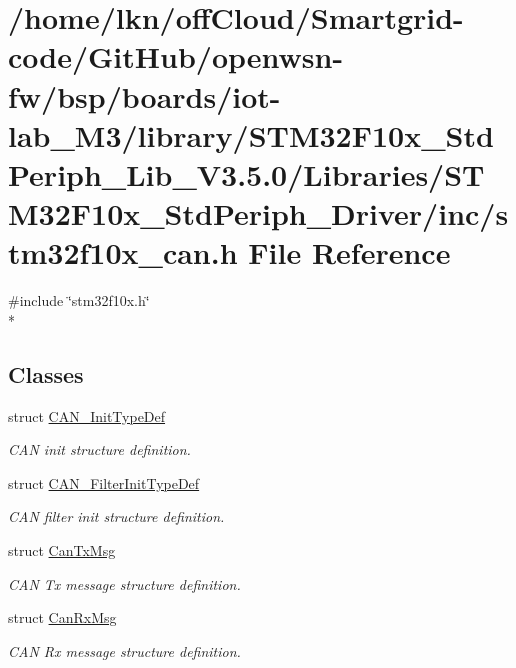 \hypertarget{iot-lab___m3_2library_2_s_t_m32_f10x___std_periph___lib___v3_85_80_2_libraries_2_s_t_m32_f10x___8ddc44d808dd489e74f711417ad7412c}{}\section{/home/lkn/off\+Cloud/\+Smartgrid-\/code/\+Git\+Hub/openwsn-\/fw/bsp/boards/iot-\/lab\+\_\+\+M3/library/\+S\+T\+M32\+F10x\+\_\+\+Std\+Periph\+\_\+\+Lib\+\_\+\+V3.5.0/\+Libraries/\+S\+T\+M32\+F10x\+\_\+\+Std\+Periph\+\_\+\+Driver/inc/stm32f10x\+\_\+can.h File Reference}
\label{iot-lab___m3_2library_2_s_t_m32_f10x___std_periph___lib___v3_85_80_2_libraries_2_s_t_m32_f10x___8ddc44d808dd489e74f711417ad7412c}
{\ttfamily \#include \char`\"{}stm32f10x.\+h\char`\"{}}\\*
\subsection*{Classes}
\begin{DoxyCompactItemize}
\item 
struct \hyperlink{struct_c_a_n___init_type_def}{C\+A\+N\+\_\+\+Init\+Type\+Def}
\begin{DoxyCompactList}\small\item\em C\+AN init structure definition. \end{DoxyCompactList}\item 
struct \hyperlink{struct_c_a_n___filter_init_type_def}{C\+A\+N\+\_\+\+Filter\+Init\+Type\+Def}
\begin{DoxyCompactList}\small\item\em C\+AN filter init structure definition. \end{DoxyCompactList}\item 
struct \hyperlink{struct_can_tx_msg}{Can\+Tx\+Msg}
\begin{DoxyCompactList}\small\item\em C\+AN Tx message structure definition. \end{DoxyCompactList}\item 
struct \hyperlink{struct_can_rx_msg}{Can\+Rx\+Msg}
\begin{DoxyCompactList}\small\item\em C\+AN Rx message structure definition. \end{DoxyCompactList}\end{DoxyCompactItemize}
